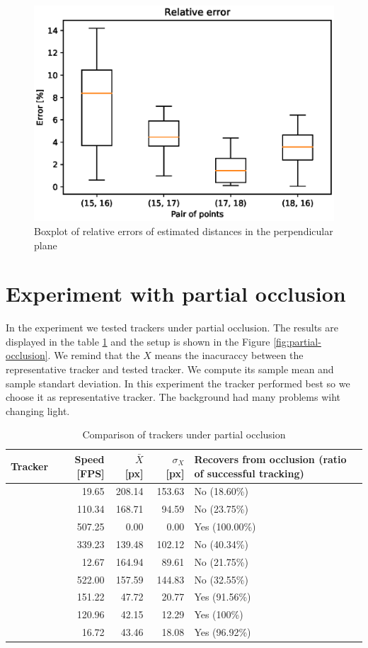 \begin{figure}
\includegraphics[width=\linewidth]{experiments/63/table.eps}
\caption{Boxplot of relative errors of estimated distances in the perpendicular plane}
\label{table:63table}
\end{figure}

\section{Experiment with partial occlusion}

In the experiment we tested trackers under partial occlusion. The results are
displayed in the table \ref{table:partial-occlusion} and the setup is shown in
the Figure \ref{fig:partial-occlusion}. We remind that the $X$ means the
inacuraccy between the representative tracker and tested tracker. We compute
its sample mean and sample standart deviation. In this experiment the \hsv{}
tracker performed best so we choose it as representative tracker. The
\simback{} background had many problems wiht changing light.

\begin{table}
\centering
\begin{tabular}{l|r|r|r|p{4cm}}
Tracker & Speed [FPS] & $\bar{X}$ [px] & $\sigma_X$ [px] &  Recovers from occlusion (ratio of successful tracking) \\
\hline
\boost{} & 19.65 & 208.14 & 153.63 & No (18.60\%) \\
\corr{} & 110.34 & 168.71 & 94.59 & No (23.75\%)\\
\hsv{} & 507.25 & 0.00 & 0.00 & Yes (100.00\%) \\
\medflow{} & 339.23 & 139.48 & 102.12 & No (40.34\%) \\
\mil{} & 12.67 & 164.94 & 89.61 &  No (21.75\%)\\
\mosse{} & 522.00 & 157.59 & 144.83 & No (32.55\%) \\
\patt{} & 151.22 & 47.72 & 20.77 & Yes (91.56\%)\\
\simback{} & 120.96 & 42.15 & 12.29 & Yes (100\%)\\
\tld{} & 16.72 & 43.46 & 18.08 & Yes (96.92\%)\\
\end{tabular}
\caption{Comparison of trackers under partial occlusion}
\label{table:partial-occlusion}
\end{table}


